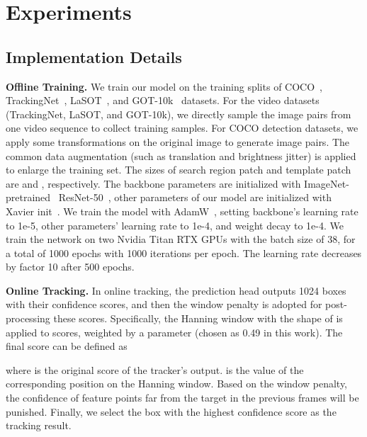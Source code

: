 \documentclass[final]{cvpr}
\newcommand{\ignore}[1]{}
\begin{document}
\section{Experiments}
\label{sec-exp}

 


\subsection{Implementation Details}

{\noindent \textbf{Offline Training. }}
We train our model on the training splits of COCO~\cite{COCO}, TrackingNet~\cite{trackingnet}, LaSOT~\cite{LaSOT}, 
and GOT-10k~\cite{GOT10K} datasets. 
For the video datasets (TrackingNet, LaSOT, and GOT-10k), we directly sample the image pairs from one video sequence 
to collect training samples. 
For COCO detection datasets, we apply some transformations on the original image to generate image pairs. 
The common data augmentation (such as translation and brightness jitter) is applied to enlarge the training set.
The sizes of search region patch and template patch are  and , respectively. 
The backbone parameters are initialized with \ignore{ResNet-50~\cite{ResNet} pre-trained on ImageNet~\cite{ImageNet}}
ImageNet-pretrained~\cite{ImageNet} ResNet-50~\cite{ResNet}, 
other parameters of our model are initialized with Xavier init~\cite{Xavier}. 
We train the model with AdamW~\cite{AdamW}, setting backbone's learning rate to 1e-5,
other parameters' learning rate to 1e-4, 
and weight decay to 1e-4.
We train the network on two Nvidia Titan RTX GPUs with the batch size of 38, for a total of 1000 epochs with 1000 iterations per epoch. 
The learning rate decreases by factor 10 after 500 epochs. 

{\noindent \textbf{Online Tracking. }}
In online tracking, the prediction head outputs 1024 boxes with their confidence scores, 
and then the window penalty is adopted for post-processing these scores. Specifically, the Hanning window with the shape of  is applied to scores, weighted by a parameter  (chosen as 0.49 in this work). The final score  can be defined as 

where  is the original score of the tracker's output.  is the value of the corresponding position on the Hanning window. 
Based on the window penalty, the confidence of feature points far from the target in the previous frames will be punished. 
Finally, we select the box with the highest confidence score as the tracking result. 
\end{document}
